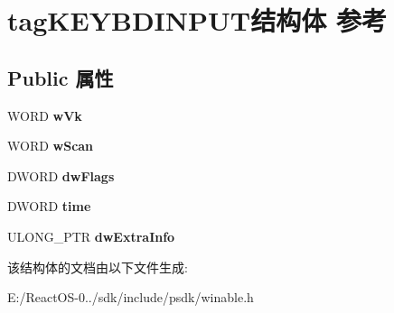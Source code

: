 \hypertarget{structtag_k_e_y_b_d_i_n_p_u_t}{}\section{tag\+K\+E\+Y\+B\+D\+I\+N\+P\+U\+T结构体 参考}
\label{structtag_k_e_y_b_d_i_n_p_u_t}
\subsection*{Public 属性}
\begin{DoxyCompactItemize}
\item 
\mbox{\label{structtag_k_e_y_b_d_i_n_p_u_t_a4409a77baea3bec472f98a23ccbad55b}} 
W\+O\+RD {\bfseries w\+Vk}
\item 
\mbox{\label{structtag_k_e_y_b_d_i_n_p_u_t_a60720b0d74b1aead6cb48a3136631c36}} 
W\+O\+RD {\bfseries w\+Scan}
\item 
\mbox{\label{structtag_k_e_y_b_d_i_n_p_u_t_a21e060927932ab83ad4e36a53341fd66}} 
D\+W\+O\+RD {\bfseries dw\+Flags}
\item 
\mbox{\label{structtag_k_e_y_b_d_i_n_p_u_t_af7f8fb37f44fd91f95f247c555759ae9}} 
D\+W\+O\+RD {\bfseries time}
\item 
\mbox{\label{structtag_k_e_y_b_d_i_n_p_u_t_ae0f825dd8c35fabc2a9e3115d871d5a6}} 
U\+L\+O\+N\+G\+\_\+\+P\+TR {\bfseries dw\+Extra\+Info}
\end{DoxyCompactItemize}


该结构体的文档由以下文件生成\+:\begin{DoxyCompactItemize}
\item 
E\+:/\+React\+O\+S-\/0../sdk/include/psdk/winable.\+h\end{DoxyCompactItemize}
